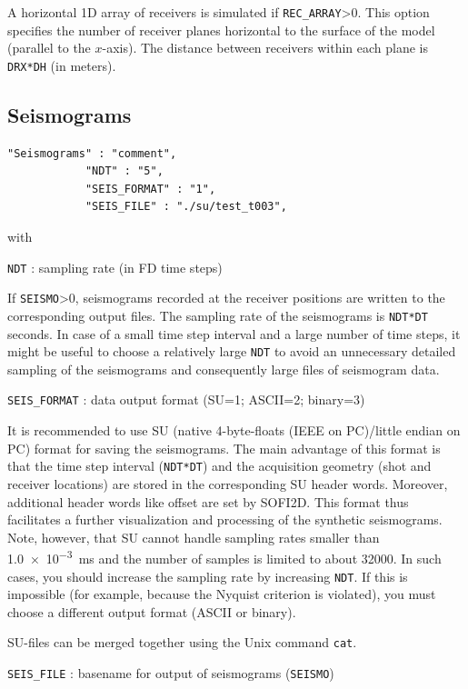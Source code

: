 A horizontal 1D array of receivers is simulated if \texttt{REC\_ARRAY}>0. This option specifies the number of receiver planes horizontal to the surface of the model (parallel to the $x$-axis). The distance between receivers within each plane is \texttt{DRX*DH} (in meters).

\subsection{Seismograms}
\label{seismograms}
\begin{verbatim}
"Seismograms" : "comment",
            "NDT" : "5",
            "SEIS_FORMAT" : "1",
            "SEIS_FILE" : "./su/test_t003",
\end{verbatim}

with

\texttt{NDT} : sampling rate (in FD time steps)

If \texttt{SEISMO}>0, seismograms recorded at the receiver positions are written to the corresponding output files. The sampling rate of the seismograms is \texttt{NDT*DT} seconds. In case of a small time step interval and a large number of time steps, it might be useful to choose a relatively large \texttt{NDT} to avoid an unnecessary detailed sampling of the seismograms and consequently large files of seismogram data.

\texttt{SEIS\_FORMAT} : data output format (SU=1; ASCII=2; binary=3)

It is recommended to use SU (native 4-byte-floats (IEEE on PC)/little endian on PC) format for saving the seismograms. The main advantage of this format is that the time step interval (\texttt{NDT*DT}) and the acquisition geometry (shot and receiver locations) are stored in the corresponding SU header words. Moreover, additional header words like offset are set by SOFI2D. This format thus facilitates a further visualization and processing of the synthetic seismograms. Note, however, that SU cannot handle sampling rates smaller than \SI{1.0e-3}{ms} and the number of samples is limited to about \SI{32000}{}. In such cases, you should increase the sampling rate by increasing \texttt{NDT}. If this is impossible (for example, because the Nyquist criterion is violated), you must choose a different output format (ASCII or binary). 

SU-files can be merged together using the Unix command \texttt{cat}. 

\texttt{SEIS\_FILE} : basename for output of seismograms (\texttt{SEISMO})

